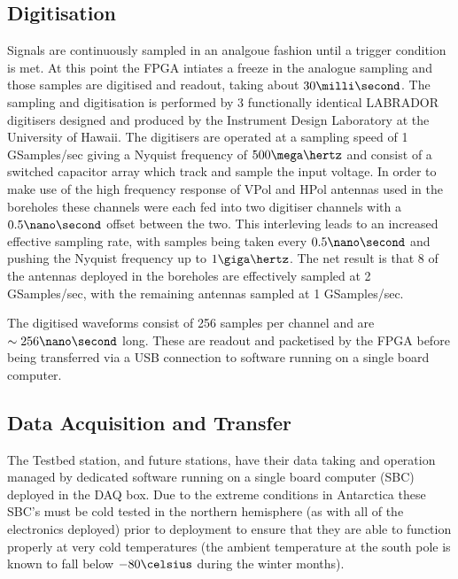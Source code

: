\subsection{Digitisation}
\label{sec:ara-detector:TestBed:Digitisation}

Signals are continuously sampled in an analgoue fashion until a trigger condition is met. At this point the FPGA intiates a freeze in the analogue sampling and those samples are digitised and readout, taking about $30 \milli \second$. The sampling and digitisation is performed by 3 functionally identical LABRADOR digitisers designed and produced by the Instrument Design Laboratory at the University of Hawaii. The digitisers are operated at a sampling speed of 1 GSamples/sec giving a Nyquist frequency of $500 \mega \hertz$ and consist of a switched capacitor array which track and sample the input voltage. In order to make use of the high frequency response of VPol and HPol antennas used in the boreholes these channels were each fed into two digitiser channels with a $0.5 \nano \second$ offset between the two. This interleving leads to an increased effective sampling rate, with samples being taken every $0.5 \nano \second$ and pushing the Nyquist frequency up to $1 \giga \hertz$. The net result is that 8 of the antennas deployed in the boreholes are effectively sampled at 2 GSamples/sec, with the remaining antennas sampled at 1 GSamples/sec.


The digitised waveforms consist of 256 samples per channel and are $\sim 256 \nano \second$ long. These are readout and packetised by the FPGA before being transferred via a USB connection to software running on a single board computer.

\subsection{Data Acquisition and Transfer}
\label{sec:ara-detector:TestBed:Data-Acquisition}

The Testbed station, and future stations, have their data taking and operation managed by dedicated software running on a single board computer (SBC) deployed in the DAQ box. Due to the extreme conditions in Antarctica these SBC's must be cold tested in the northern hemisphere (as with all of the electronics deployed) prior to deployment to ensure that they are able to function properly at very cold temperatures (the ambient temperature at the south pole is known to fall below $-80 \celsius $ during the winter months).

